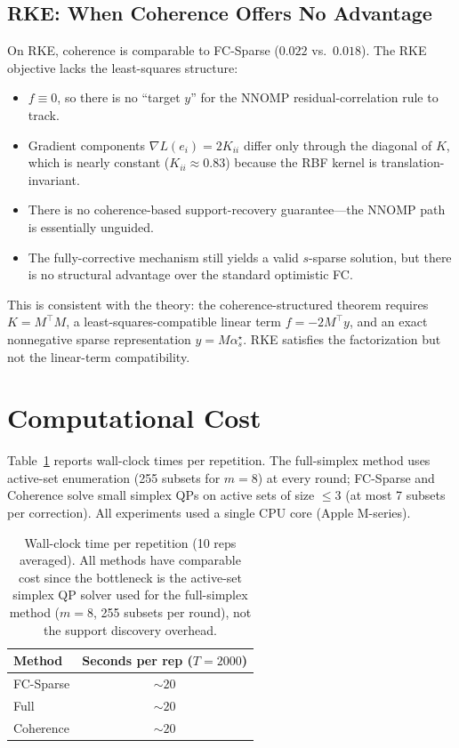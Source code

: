 \documentclass[11pt]{article}
\newcommand{\1}{\mathbf{1}}
\begin{document}
\subsection{RKE: When Coherence Offers No Advantage}

On RKE, coherence is comparable to FC-Sparse ($0.022$ vs.\ $0.018$). The RKE objective lacks the least-squares structure:
\begin{itemize}[leftmargin=*]
    \item $f \equiv 0$, so there is no ``target $y$'' for the NNOMP residual-correlation rule to track.
    \item Gradient components $\nabla L(e_i) = 2K_{ii}$ differ only through the diagonal of $K$, which is nearly constant ($K_{ii} \approx 0.83$) because the RBF kernel is translation-invariant.
    \item There is no coherence-based support-recovery guarantee---the NNOMP path is essentially unguided.
    \item The fully-corrective mechanism still yields a valid $s$-sparse solution, but there is no structural advantage over the standard optimistic FC.
\end{itemize}

This is consistent with the theory: the coherence-structured theorem requires $K=M^\top M$, a least-squares-compatible linear term $f = -2M^\top y$, and an exact nonnegative sparse representation $y = M\alpha_s^\star$. RKE satisfies the factorization but not the linear-term compatibility.

\section{Computational Cost}

Table~\ref{tab:compute} reports wall-clock times per repetition. The full-simplex method uses active-set enumeration (255 subsets for $m=8$) at every round; FC-Sparse and Coherence solve small simplex QPs on active sets of size $\le 3$ (at most 7 subsets per correction). All experiments used a single CPU core (Apple M-series).

\begin{table}[H]
\centering
\begin{tabular}{l|c}
\toprule
\textbf{Method} & \textbf{Seconds per rep} ($T=2000$) \\
\midrule
FC-Sparse & $\sim 20$ \\
Full & $\sim 20$ \\
Coherence & $\sim 20$ \\
\bottomrule
\end{tabular}
\caption{Wall-clock time per repetition (10 reps averaged). All methods have comparable cost since the bottleneck is the active-set simplex QP solver used for the full-simplex method ($m=8$, 255 subsets per round), not the support discovery overhead.}
\label{tab:compute}
\end{table}
\end{document}
